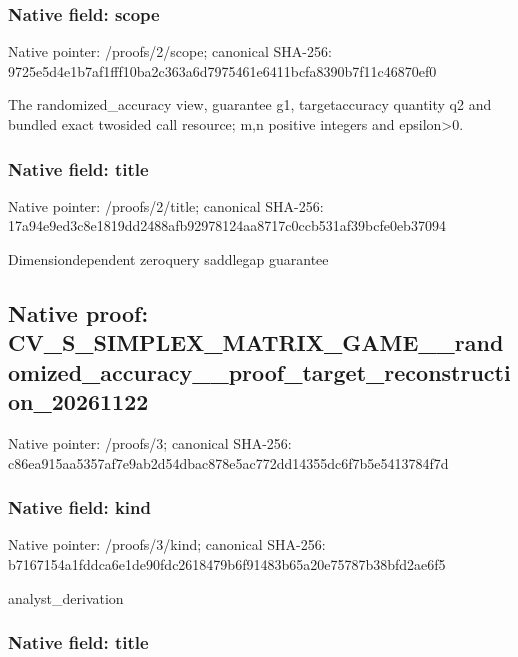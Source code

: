 \documentclass[10pt,a4paper]{article}
\begin{document}
\subsubsection{Native field: scope}


Native pointer: /proofs/2/scope; canonical SHA-256: 9725e5d4e1b7af1fff10ba2c\allowbreak{}363a6d7975461e6411bcfa83\allowbreak{}90b7f11c46870ef0


The randomized\_accuracy view, guarantee g1, targetaccuracy quantity q2 and bundled exact twosided call resource; m,n positive integers and epsilon>0.


\subsubsection{Native field: title}


Native pointer: /proofs/2/title; canonical SHA-256: 17a94e9ed3c8e1819dd2488a\allowbreak{}fb92978124aa8717c0ccb531\allowbreak{}af39bcfe0eb37094


Dimensiondependent zeroquery saddlegap guarantee


\subsection{Native proof: CV\_S\_SIMPLEX\_MATRIX\_GAME\allowbreak{}\_\_randomized\_accuracy\_\_p\allowbreak{}roof\_target\_reconstructi\allowbreak{}on\_20261122}


Native pointer: /proofs/3; canonical SHA-256: c86ea915aa5357af7e9ab2d5\allowbreak{}4dbac878e5ac772dd14355dc\allowbreak{}6f7b5e5413784f7d



\subsubsection{Native field: kind}


Native pointer: /proofs/3/kind; canonical SHA-256: b7167154a1fddca6e1de90fd\allowbreak{}c2618479b6f91483b65a20e7\allowbreak{}5787b38bfd2ae6f5


analyst\_derivation


\subsubsection{Native field: title}
\end{document}
